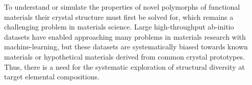 %



%
%
To understand or simulate the properties of novel polymorphs of functional materials their crystal structure must first be solved for,
which remains a challenging problem in materials science.
\cite{Woodley2008,Graser2018}
%
Large high-throughput ab-initio datasets
\cite{Saal2013,Jain2013,Curtarolo2012, mamun2019high}
have enabled approaching many problems in materials research with machine-learning,
\cite{Kirklin2015}
but these datasets are systematically biased towards known materials or hypothetical materials derived from common crystal prototypes.
%
Thus, there is a need for the systematic exploration of structural diversity at target elemental compositions.


